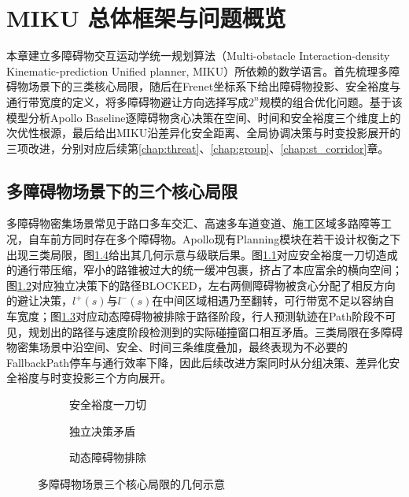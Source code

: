\chapter{MIKU 总体框架与问题概览}
\label{chap:framework}

本章建立多障碍物交互运动学统一规划算法（Multi-obstacle Interaction-density Kinematic-prediction Unified planner, MIKU）所依赖的数学语言。首先梳理多障碍物场景下的三类核心局限，随后在Frenet坐标系下给出障碍物投影、安全裕度与通行带宽度的定义，将多障碍物避让方向选择写成$2^n$规模的组合优化问题。基于该模型分析Apollo Baseline逐障碍物贪心决策在空间、时间和安全裕度三个维度上的次优性根源，最后给出MIKU沿差异化安全距离、全局协调决策与时变投影展开的三项改进，分别对应后续第\ref{chap:threat}、\ref{chap:group}、\ref{chap:st_corridor}章。

\section{多障碍物场景下的三个核心局限}

多障碍物密集场景常见于路口多车交汇、高速多车道变道、施工区域多路障等工况，自车前方同时存在多个障碍物。Apollo现有Planning模块在若干设计权衡之下出现三类局限，图\ref{fig:problem_overview}给出其几何示意与级联后果。图\ref{fig:problem_overview:a}对应安全裕度一刀切造成的通行带压缩，窄小的路锥被过大的统一缓冲包裹，挤占了本应富余的横向空间；图\ref{fig:problem_overview:b}对应独立决策下的路径BLOCKED，左右两侧障碍物被贪心分配了相反方向的避让决策，$l^+(s)$与$l^-(s)$在中间区域相遇乃至翻转，可行带宽不足以容纳自车宽度；图\ref{fig:problem_overview:c}对应动态障碍物被排除于路径阶段，行人预测轨迹在Path阶段不可见，规划出的路径与速度阶段检测到的实际碰撞窗口相互矛盾。三类局限在多障碍物密集场景中沿空间、安全、时间三条维度叠加，最终表现为不必要的FallbackPath停车与通行效率下降，因此后续改进方案同时从分组决策、差异化安全裕度与时变投影三个方向展开。

\begin{figure}[htbp]
\centering
\begin{subfigure}[b]{0.48\textwidth}
  \centering
  \caption{安全裕度一刀切}
  \label{fig:problem_overview:a}
\end{subfigure}\hfill
\begin{subfigure}[b]{0.48\textwidth}
  \centering
  \caption{独立决策矛盾}
  \label{fig:problem_overview:b}
\end{subfigure}

\vspace{0.6em}
\begin{subfigure}[b]{0.48\textwidth}
  \centering
  \caption{动态障碍物排除}
  \label{fig:problem_overview:c}
\end{subfigure}
\caption{多障碍物场景三个核心局限的几何示意}
\label{fig:problem_overview}
\end{figure}
